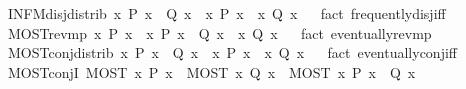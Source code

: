\begin{isabellebody}
\endisatagproof
{\isafoldproof}%
%
\isadelimproof
%
\endisadelimproof
\isanewline
{}\isamarkupfalse%
\ INFM{\isacharunderscore}disj{\isacharunderscore}distrib{\isacharcolon}\ {\isachardoublequoteopen}{\isacharparenleft}{\isasymexists}\isactrlsub {\isasyminfinity}x{\isachardot}\ P\ x\ {\isasymor}\ Q\ x{\isacharparenright}\ {\isasymlongleftrightarrow}\ {\isacharparenleft}{\isasymexists}\isactrlsub {\isasyminfinity}x{\isachardot}\ P\ x{\isacharparenright}\ {\isasymor}\ {\isacharparenleft}{\isasymexists}\isactrlsub {\isasyminfinity}x{\isachardot}\ Q\ x{\isacharparenright}{\isachardoublequoteclose}%
\isadelimproof
\ %
\endisadelimproof
%
\isatagproof
{}\isamarkupfalse%
\ {\isacharparenleft}fact\ frequently{\isacharunderscore}disj{\isacharunderscore}iff{\isacharparenright}%
\endisatagproof
{\isafoldproof}%
%
\isadelimproof
%
\endisadelimproof
\isanewline
{}\isamarkupfalse%
\ MOST{\isacharunderscore}rev{\isacharunderscore}mp{\isacharcolon}\ {\isachardoublequoteopen}{\isasymforall}\isactrlsub {\isasyminfinity}x{\isachardot}\ P\ x\ {\isasymLongrightarrow}\ {\isasymforall}\isactrlsub {\isasyminfinity}x{\isachardot}\ P\ x\ {\isasymlongrightarrow}\ Q\ x\ {\isasymLongrightarrow}\ {\isasymforall}\isactrlsub {\isasyminfinity}x{\isachardot}\ Q\ x{\isachardoublequoteclose}%
\isadelimproof
\ %
\endisadelimproof
%
\isatagproof
{}\isamarkupfalse%
\ {\isacharparenleft}fact\ eventually{\isacharunderscore}rev{\isacharunderscore}mp{\isacharparenright}%
\endisatagproof
{\isafoldproof}%
%
\isadelimproof
%
\endisadelimproof
\isanewline
{}\isamarkupfalse%
\ MOST{\isacharunderscore}conj{\isacharunderscore}distrib{\isacharcolon}\ {\isachardoublequoteopen}{\isacharparenleft}{\isasymforall}\isactrlsub {\isasyminfinity}x{\isachardot}\ P\ x\ {\isasymand}\ Q\ x{\isacharparenright}\ {\isasymlongleftrightarrow}\ {\isacharparenleft}{\isasymforall}\isactrlsub {\isasyminfinity}x{\isachardot}\ P\ x{\isacharparenright}\ {\isasymand}\ {\isacharparenleft}{\isasymforall}\isactrlsub {\isasyminfinity}x{\isachardot}\ Q\ x{\isacharparenright}{\isachardoublequoteclose}%
\isadelimproof
\ %
\endisadelimproof
%
\isatagproof
{}\isamarkupfalse%
\ {\isacharparenleft}fact\ eventually{\isacharunderscore}conj{\isacharunderscore}iff{\isacharparenright}%
\endisatagproof
{\isafoldproof}%
%
\isadelimproof
%
\endisadelimproof
\isanewline
{}\isamarkupfalse%
\ MOST{\isacharunderscore}conjI{\isacharcolon}\ {\isachardoublequoteopen}MOST\ x{\isachardot}\ P\ x\ {\isasymLongrightarrow}\ MOST\ x{\isachardot}\ Q\ x\ {\isasymLongrightarrow}\ MOST\ x{\isachardot}\ P\ x\ {\isasymand}\ Q\ x{\isachardoublequoteclose}%

\end{isabellebody}

